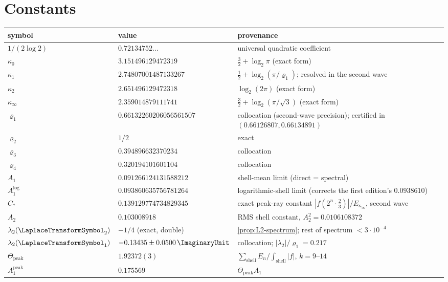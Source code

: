 \documentclass[11pt,oneside]{article}
\theoremstyle{definition}
\theoremstyle{remark}
\begin{document}
\section{Constants}
\label{app:constants}

\begin{center}
\begin{tabularx}{\textwidth}{@{}l
 >{\raggedright\arraybackslash}p{}
 >{\raggedright\arraybackslash}X@{}}
\toprule
symbol & value & provenance \\
\midrule
$1/(2\log2)$ & $0.72134752\ldots$ & universal quadratic coefficient\\
$\kappa_0$ & $3.151496129472319$ & $\tfrac32+\log_2\pi$ (exact form)\\
$\kappa_1$ & $2.74807001487133267$ & $\tfrac12+\log_2(\pi/\varrho_1)$;
resolved in the second wave\\
$\kappa_2$ & $2.651496129472318$ & $\log_2(2\pi)$ (exact form)\\
$\kappa_\infty$ & $2.359014879111741$ & $\tfrac32+\log_2(\pi/\sqrt3)$ (exact form)\\
$\varrho_1$ & $0.66132260206056561507$ & collocation (second-wave
precision); certified in $(0.66126807,0.66134891)$\\
$\varrho_2$ & $1/2$ & exact\\
$\varrho_3$ & $0.394896632370234$ & collocation\\
$\varrho_4$ & $0.320194101601104$ & collocation\\
$A_1$ & $0.091266124131588212$ & shell-mean limit (direct = spectral)\\
$A_1^{\log}$ & $0.093860635756781264$ & logarithmic-shell limit
(corrects the first edition's $0.0938610$)\\
$C_*$ & $0.139129774734829345$ & exact peak-ray constant
$|f(2^n\cdot\tfrac23)|/E_{\kappa_\infty}$, second wave\\
$A_2$ & $0.103008918$ & RMS shell constant, $A_2^2=0.0106108372$\\
$\lambda_2(\LaplaceTransformSymbol_2)$ & $-1/4$ (exact, double) & \cref{prop:L2-spectrum};
rest of spectrum $<3\cdot10^{-4}$\\
$\lambda_2(\LaplaceTransformSymbol_1)$ & $-0.13435\pm0.0500\,\ImaginaryUnit$ & collocation;
$|\lambda_2|/\varrho_1=0.217$\\
$\Theta_{\mathrm{peak}}$ & $1.92372(3)$ &
$\sum_{\mathrm{shell}}E_n/\int_{\mathrm{shell}}|f|$, $k=9$--$14$\\
$A_1^{\mathrm{peak}}$ & $0.175569$ & $\Theta_{\mathrm{peak}}A_1$

\end{tabularx}
\end{center}
\end{document}
